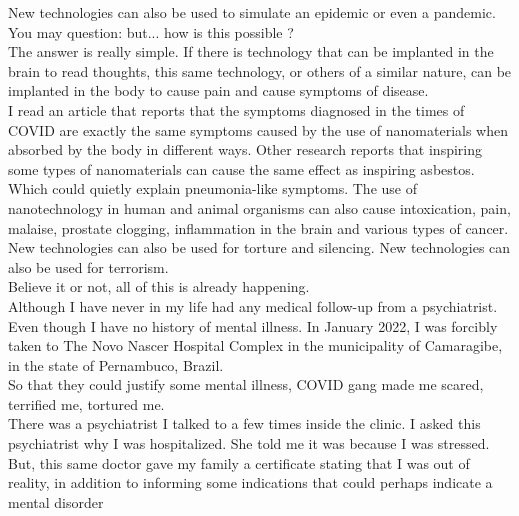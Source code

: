 \documentclass[11pt]{book}
\begin{document}
\noindent New technologies can also be used to simulate an epidemic or even a pandemic. \\

\noindent You may question: but... how is this possible ? \\

\noindent The answer is really simple. If there is technology that can be implanted in the brain to read thoughts, this same technology, or others of a similar nature, can be implanted in the body to cause pain and cause symptoms of disease. \\

\noindent I read an article that reports that the symptoms diagnosed in the times of COVID are exactly the same symptoms caused by the use of nanomaterials when absorbed by the body in different ways. Other research reports that inspiring some types of nanomaterials can cause the same effect as inspiring asbestos. Which could quietly explain pneumonia-like symptoms. The use of nanotechnology in human and animal organisms can also cause intoxication, pain, malaise, prostate clogging, inflammation in the brain and various types of cancer. \\

\noindent New technologies can also be used for torture and silencing. New technologies can also be used for terrorism. \\

\noindent Believe it or not, all of this is already happening. \\

\noindent Although I have never in my life had any medical follow-up from a psychiatrist. Even though I have no history of mental illness. In January 2022, I was forcibly taken to The Novo Nascer Hospital Complex in the municipality of Camaragibe, in the state of Pernambuco, Brazil. \\

\noindent So that they could justify some mental illness, COVID gang made me scared, terrified me, tortured me. \\

\noindent There was a psychiatrist I talked to a few times inside the clinic. I asked this psychiatrist why I was hospitalized. She told me it was because I was stressed. But, this same doctor gave my family a certificate stating that I was out of reality, in addition to informing some indications that could perhaps indicate a mental disorder \\
\end{document}
